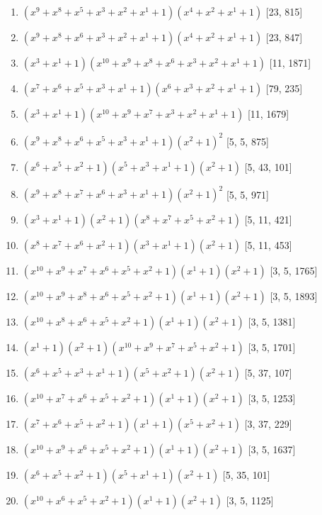 \documentclass[10pt,twocolumn]{article}
\begin{document}
\begin{enumerate}
\item $(x^{9} + x^{8} + x^{5} + x^{3} + x^{2} + x^{1} + 1)(x^{4} + x^{2} + x^{1} + 1)$  [23, 815]
\item $(x^{9} + x^{8} + x^{6} + x^{3} + x^{2} + x^{1} + 1)(x^{4} + x^{2} + x^{1} + 1)$  [23, 847]
\item $(x^{3} + x^{1} + 1)(x^{10} + x^{9} + x^{8} + x^{6} + x^{3} + x^{2} + x^{1} + 1)$  [11, 1871]
\item $(x^{7} + x^{6} + x^{5} + x^{3} + x^{1} + 1)(x^{6} + x^{3} + x^{2} + x^{1} + 1)$  [79, 235]
\item $(x^{3} + x^{1} + 1)(x^{10} + x^{9} + x^{7} + x^{3} + x^{2} + x^{1} + 1)$  [11, 1679]
\item $(x^{9} + x^{8} + x^{6} + x^{5} + x^{3} + x^{1} + 1)(x^{2} + 1)^{2}$  [5, 5, 875]
\item $(x^{6} + x^{5} + x^{2} + 1)(x^{5} + x^{3} + x^{1} + 1)(x^{2} + 1)$  [5, 43, 101]
\item $(x^{9} + x^{8} + x^{7} + x^{6} + x^{3} + x^{1} + 1)(x^{2} + 1)^{2}$  [5, 5, 971]
\item $(x^{3} + x^{1} + 1)(x^{2} + 1)(x^{8} + x^{7} + x^{5} + x^{2} + 1)$  [5, 11, 421]
\item $(x^{8} + x^{7} + x^{6} + x^{2} + 1)(x^{3} + x^{1} + 1)(x^{2} + 1)$  [5, 11, 453]
\item $(x^{10} + x^{9} + x^{7} + x^{6} + x^{5} + x^{2} + 1)(x^{1} + 1)(x^{2} + 1)$  [3, 5, 1765]
\item $(x^{10} + x^{9} + x^{8} + x^{6} + x^{5} + x^{2} + 1)(x^{1} + 1)(x^{2} + 1)$  [3, 5, 1893]
\item $(x^{10} + x^{8} + x^{6} + x^{5} + x^{2} + 1)(x^{1} + 1)(x^{2} + 1)$  [3, 5, 1381]
\item $(x^{1} + 1)(x^{2} + 1)(x^{10} + x^{9} + x^{7} + x^{5} + x^{2} + 1)$  [3, 5, 1701]
\item $(x^{6} + x^{5} + x^{3} + x^{1} + 1)(x^{5} + x^{2} + 1)(x^{2} + 1)$  [5, 37, 107]
\item $(x^{10} + x^{7} + x^{6} + x^{5} + x^{2} + 1)(x^{1} + 1)(x^{2} + 1)$  [3, 5, 1253]
\item $(x^{7} + x^{6} + x^{5} + x^{2} + 1)(x^{1} + 1)(x^{5} + x^{2} + 1)$  [3, 37, 229]
\item $(x^{10} + x^{9} + x^{6} + x^{5} + x^{2} + 1)(x^{1} + 1)(x^{2} + 1)$  [3, 5, 1637]
\item $(x^{6} + x^{5} + x^{2} + 1)(x^{5} + x^{1} + 1)(x^{2} + 1)$  [5, 35, 101]
\item $(x^{10} + x^{6} + x^{5} + x^{2} + 1)(x^{1} + 1)(x^{2} + 1)$  [3, 5, 1125]

\end{enumerate}
\end{document}

